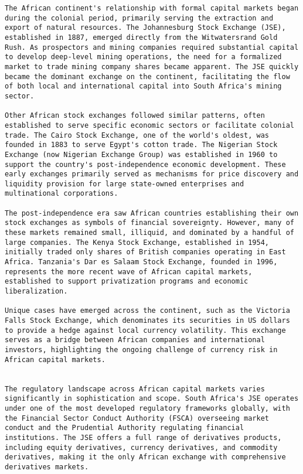 \documentclass[12pt]{article}
\begin{document}
{{{\begin{itemize}
\begin{lstlisting}
The African continent's relationship with formal capital markets began during the colonial period, primarily serving the extraction and export of natural resources. The Johannesburg Stock Exchange (JSE), established in 1887, emerged directly from the Witwatersrand Gold Rush. As prospectors and mining companies required substantial capital to develop deep-level mining operations, the need for a formalized market to trade mining company shares became apparent. The JSE quickly became the dominant exchange on the continent, facilitating the flow of both local and international capital into South Africa's mining sector.

Other African stock exchanges followed similar patterns, often established to serve specific economic sectors or facilitate colonial trade. The Cairo Stock Exchange, one of the world's oldest, was founded in 1883 to serve Egypt's cotton trade. The Nigerian Stock Exchange (now Nigerian Exchange Group) was established in 1960 to support the country's post-independence economic development. These early exchanges primarily served as mechanisms for price discovery and liquidity provision for large state-owned enterprises and multinational corporations.

The post-independence era saw African countries establishing their own stock exchanges as symbols of financial sovereignty. However, many of these markets remained small, illiquid, and dominated by a handful of large companies. The Kenya Stock Exchange, established in 1954, initially traded only shares of British companies operating in East Africa. Tanzania's Dar es Salaam Stock Exchange, founded in 1996, represents the more recent wave of African capital markets, established to support privatization programs and economic liberalization.

Unique cases have emerged across the continent, such as the Victoria Falls Stock Exchange, which denominates its securities in US dollars to provide a hedge against local currency volatility. This exchange serves as a bridge between African companies and international investors, highlighting the ongoing challenge of currency risk in African capital markets.


The regulatory landscape across African capital markets varies significantly in sophistication and scope. South Africa's JSE operates under one of the most developed regulatory frameworks globally, with the Financial Sector Conduct Authority (FSCA) overseeing market conduct and the Prudential Authority regulating financial institutions. The JSE offers a full range of derivatives products, including equity derivatives, currency derivatives, and commodity derivatives, making it the only African exchange with comprehensive derivatives markets.


\end{lstlisting}
\end{itemize}}}}
\end{document}
